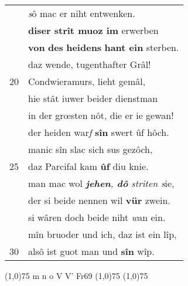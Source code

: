 \documentclass[8pt,a4paper,notitlepage]{article}
\begin{document}
\begin{table}[ht]
\begin{minipage}[t]{0.5\linewidth}
\begin{tabular}{rl}
 & \textit{s}ô mac er niht entwenken.\\ 
 & \textbf{diser strît muoz im} erwerben\\ 
 & \textbf{von} \textbf{des} \textbf{heidens} \textbf{hant ein} sterben.\\ 
 & daz wende, tugenthafter Grâl!\\ 
20 & Condwieramurs, lieht gemâl,\\ 
 & hie stât iuwer beider dienstman\\ 
 & in der grœsten nôt, die er ie gewan!\\ 
 & der heiden war\textit{f} \textbf{sîn} swert ûf hôch.\\ 
 & manic sîn slac sich sus gezôch,\\ 
25 & daz Parcifal kam \textbf{ûf} diu knie.\\ 
 & man mac wol \textit{\textbf{jehen}, \textbf{dô} striten s}ie,\\ 
 & der si beide nennen wil \textbf{vür} zwein.\\ 
 & si wâren doch beide niht \textit{w}an ein.\\ 
 & mîn bruoder und ich, daz ist ein lîp,\\ 
30 & alsô ist guot man und \textbf{sîn} wîp.\\ 
\end{tabular}
\scriptsize
\line(1,0){75} \newline
m n o V V' Fr69 \newline
\line(1,0){75} \newline
\newline
\line(1,0){75} \newline

\end{minipage}
\end{table}
\end{document}
